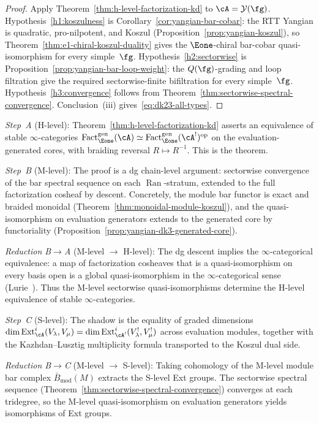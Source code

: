 \begin{proof}
Apply Theorem~\ref{thm:h-level-factorization-kd} to
$\cA = \mathcal{Y}(\fg)$.
Hypothesis~\ref{h1:koszulness} is
Corollary~\ref{cor:yangian-bar-cobar}: the RTT Yangian is
quadratic, pro-nilpotent, and Koszul
(Proposition~\ref{prop:yangian-koszul}), so
Theorem~\ref{thm:e1-chiral-koszul-duality} gives the
$\Eone$-chiral bar-cobar quasi-isomorphism for every
simple~$\fg$.
Hypothesis~\ref{h2:sectorwise} is
Proposition~\ref{prop:yangian-bar-loop-weight}: the $Q(\fg)$-grading
and loop filtration give the required sectorwise-finite bifiltration
for every simple~$\fg$.
Hypothesis~\ref{h3:convergence} follows from
Theorem~\ref{thm:sectorwise-spectral-convergence}.
Conclusion~(iii) gives~\eqref{eq:dk23-all-types}.
\end{proof}

\begin{remark}
\label{rem:dk23-hms}
\emph{Step~A} (H-level):
Theorem~\ref{thm:h-level-factorization-kd} asserts an
equivalence of stable $\infty$-categories
$\operatorname{Fact}_{\Eone}^{\mathrm{gen}}(\cA)
\simeq
\operatorname{Fact}_{\Eone}^{\mathrm{gen}}(\cA^!)^{\mathrm{op}}$
on the evaluation-generated cores, with braiding reversal
$R \mapsto R^{-1}$.  This is the theorem.

\emph{Step~B} (M-level):
The proof is a dg chain-level argument: sectorwise convergence
of the bar spectral sequence on each
$\operatorname{Ran}$-stratum, extended to the full factorization
cosheaf by descent.  Concretely, the module bar functor is exact
and braided monoidal
(Theorem~\ref{thm:monoidal-module-koszul}), and the
quasi-isomorphism on evaluation generators extends to the
generated core by functoriality
(Proposition~\ref{prop:yangian-dk3-generated-core}).

\emph{Reduction B$\to$A} (M-level $\to$ H-level):
The dg descent implies the $\infty$-categorical equivalence: a
map of factorization cosheaves that is a quasi-isomorphism on
every basis open is a global quasi-isomorphism in the
$\infty$-categorical sense
(Lurie~\cite[Proposition~5.5.2.2]{HA}).  Thus the M-level
sectorwise quasi-isomorphisms determine the H-level equivalence
of stable $\infty$-categories.

\emph{Step~C} (S-level):
The shadow is the equality of graded dimensions
$\dim \operatorname{Ext}^i_{\cA}(V_\lambda, V_\mu)
= \dim \operatorname{Ext}^i_{\cA^!}(V_\lambda^!, V_\mu^!)$
across evaluation modules, together with the Kazhdan--Lusztig
multiplicity formula transported to the Koszul dual side.

\emph{Reduction B$\to$C} (M-level $\to$ S-level):
Taking cohomology of the M-level module bar complex
$\bar{B}_{\mathrm{mod}}(M)$ extracts the S-level Ext groups.
The sectorwise spectral sequence
(Theorem~\ref{thm:sectorwise-spectral-convergence}) converges
at each tridegree, so the M-level quasi-isomorphism on
evaluation generators yields isomorphisms of Ext groups.
\end{remark}

